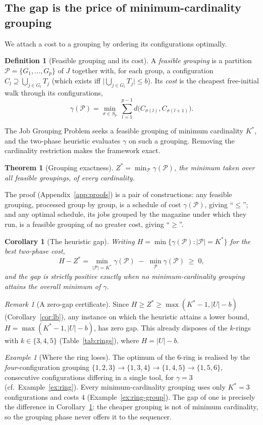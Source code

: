 \documentclass[11pt,a4paper]{article}
\theoremstyle{plain}
\newtheorem{theorem}{Theorem}
\newtheorem{corollary}{Corollary}
\theoremstyle{definition}
\newtheorem{definition}{Definition}
\theoremstyle{remark}
\newtheorem{remark}{Remark}
\newtheorem{example}{Example}
\newcommand{\U}{U}
\newcommand{\Kst}{K^{\ast}}
\newcommand{\Zst}{Z^{\ast}}
\begin{document}
\subsection{The gap is the price of minimum-cardinality grouping}\label{ssec:exact}
We attach a cost to a grouping by ordering its configurations optimally.
\begin{definition}[Feasible grouping and its cost]\label{def:grouping}
A \emph{feasible grouping} is a partition $\mathcal{P}=\{G_1,\dots,G_p\}$ of $J$
together with, for each group, a configuration $C_l\supseteq\bigcup_{j\in G_l}T_j$
(which exists iff $\lvert\bigcup_{j\in G_l}T_j\rvert\le b$). Its \emph{cost} is the
cheapest free-initial walk through its configurations,
\[
  \gamma(\mathcal{P})=\min_{\sigma\in S_p}\ \sum_{l=1}^{p-1}
  d\bigl(C_{\sigma(l)},C_{\sigma(l+1)}\bigr).
\]
\end{definition}
The Job Grouping Problem seeks a feasible grouping of minimum cardinality $\Kst$,
and the two-phase heuristic evaluates $\gamma$ on such a grouping. Removing the
cardinality restriction makes the framework exact.
\begin{theorem}[Grouping exactness]\label{thm:grouping}
$\displaystyle \Zst=\min_{\mathcal{P}}\gamma(\mathcal{P})$, the minimum taken over
\emph{all} feasible groupings, of every cardinality.
\end{theorem}
The proof (Appendix~\ref{app:proofs}) is a pair of constructions: any feasible
grouping, processed group by group, is a schedule of cost $\gamma(\mathcal{P})$,
giving ``$\le$''; and any optimal schedule, its jobs grouped by the magazine under
which they run, is a feasible grouping of no greater cost, giving ``$\ge$''.
\begin{corollary}[The heuristic gap]\label{cor:gap}
Writing $H=\min\{\gamma(\mathcal{P}):\lvert\mathcal{P}\rvert=\Kst\}$ for the best
two-phase cost,
\[
  H-\Zst=\min_{\lvert\mathcal{P}\rvert=\Kst}\gamma(\mathcal{P})
  \;-\;\min_{\mathcal{P}}\gamma(\mathcal{P})\;\ge\;0,
\]
and the gap is strictly positive exactly when no minimum-cardinality grouping
attains the overall minimum of $\gamma$.
\end{corollary}
\begin{remark}[A zero-gap certificate]\label{rem:zerogap}
Since $H\ge\Zst\ge\max(\Kst-1,\lvert\U\rvert-b)$ (Corollary~\ref{cor:lb}), any
instance on which the heuristic attains a lower bound, $H=\max(\Kst-1,\lvert\U\rvert
-b)$, has zero gap. This already disposes of the $k$-rings with $k\in\{3,4,5\}$
(Table~\ref{tab:rings}), where $H=\lvert\U\rvert-b$.
\end{remark}
\begin{example}[Where the ring loses]\label{ex:ring-why}
The optimum of the $6$-ring is realised by the \emph{four}-configuration grouping
$\{1,2,3\}\to\{1,3,4\}\to\{1,4,5\}\to\{1,5,6\}$, consecutive configurations
differing in a single tool, for $\gamma=3$ (cf.\ Example~\ref{ex:ring}). Every
minimum-cardinality grouping uses only $\Kst=3$ configurations and costs $4$
(Example~\ref{ex:ring-group}). The gap of one is precisely the difference in
Corollary~\ref{cor:gap}: the cheaper grouping is not of minimum cardinality, so the
grouping phase never offers it to the sequencer.
\end{example}
\end{document}
